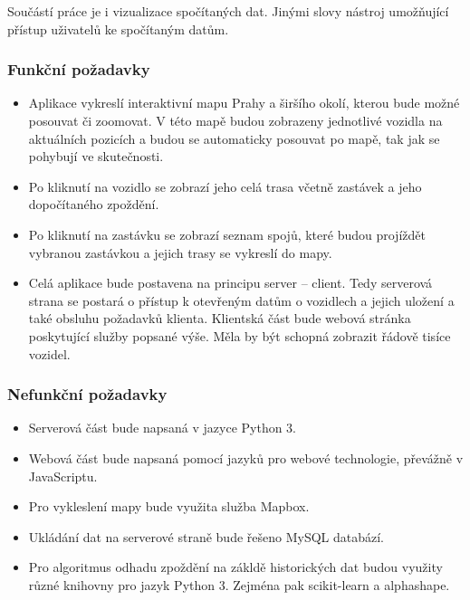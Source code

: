Součástí práce je i vizualizace spočítaných dat. Jinými slovy nástroj umožňující přístup uživatelů ke spočítaným datům.

\subsubsection{Funkční požadavky}

\begin{itemize}
	\item Aplikace vykreslí interaktivní mapu Prahy a širšího okolí, kterou bude možné posouvat či zoomovat. V této mapě budou zobrazeny jednotlivé vozidla na aktuálních pozicích a budou se automaticky posouvat po mapě, tak jak se pohybují ve skutečnosti.

	\item Po kliknutí na vozidlo se zobrazí jeho celá trasa včetně zastávek a jeho dopočítaného zpoždění.

	\item Po kliknutí na zastávku se zobrazí seznam spojů, které budou projíždět vybranou zastávkou a jejich trasy se vykreslí do mapy.

	\item Celá aplikace bude postavena na principu server -- client. Tedy serverová strana se postará o přístup k otevřeným datům o vozidlech a jejich uložení a také obsluhu požadavků klienta. Klientská část bude webová stránka poskytující služby popsané výše. Měla by být schopná zobrazit řádově tisíce vozidel.
\end{itemize}

\subsubsection{Nefunkční požadavky}

\begin{itemize}
	\item Serverová část bude napsaná v jazyce Python 3.

	\item Webová část bude napsaná pomocí jazyků pro webové technologie, převážně v JavaScriptu.

	\item Pro vykleslení mapy bude využita služba Mapbox.

	\item Ukládání dat na serverové straně bude řešeno MySQL databází.

	\item Pro algoritmus odhadu zpoždění na zákldě historických dat budou využity různé knihovny pro jazyk Python 3. Zejména pak scikit-learn a alphashape.

\end{itemize}


